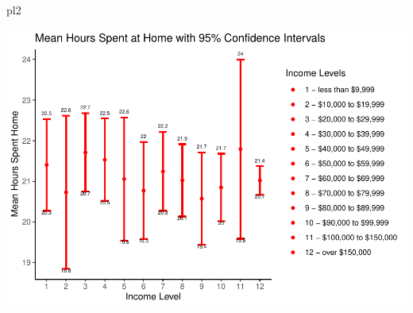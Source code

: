 \documentclass[
  11 pt,
]{article}
\newenvironment{Shaded}{\begin{snugshade}}{\end{snugshade}}
\newcommand{\NormalTok}[1]{#1}
\begin{document}
\begin{Shaded}
\begin{Highlighting}[]
\NormalTok{pl2}
\end{Highlighting}
\end{Shaded}

\includegraphics{finalreport_template_files/figure-latex/confidence_interval_plots-3.pdf}
\end{document}
